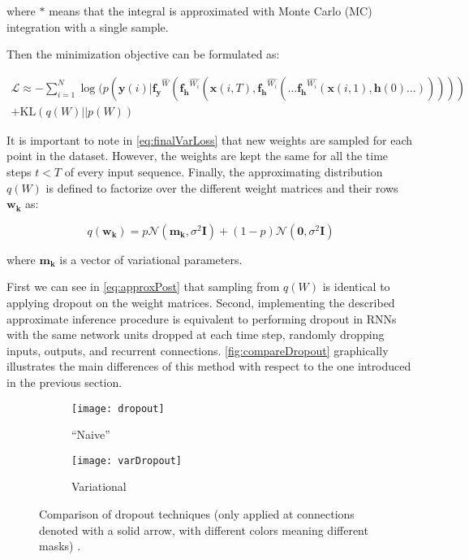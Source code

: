 where $*$ means that the integral is approximated with Monte Carlo (MC) integration with a single sample.

Then the minimization objective can be formulated as:

\begin{equation} \label{eq:finalVarLoss}
\begin{gathered}
	\mathcal{L} \approx - \sum_{i=1}^{N} \log(p(\mathbf{y}(i) | \mathbf{f_y}^{\hat{W}}(\mathbf{f_h}^{\hat{W_i}}(\mathbf{x}(i,T),\mathbf{f_h}^{\hat{W_i}}(\ldots\mathbf{f_h}^{\hat{W_i}}(\mathbf{x}(i,1),\mathbf{h}(0)\ldots))))) \\ 
	+ \text{KL}(q(W)||p(W))
\end{gathered}
\end{equation}

It is important to note in \autoref{eq:finalVarLoss} that new weights are sampled for each point in the dataset. However, the weights are kept the same for all the time steps $t<T$ of every input sequence. Finally, the approximating distribution $q(W)$ is defined to factorize over the different weight matrices and their rows $\mathbf{w_k}$ as:

\begin{equation} \label{eq:approxPost}
	q(\mathbf{w_k})=p\mathcal{N}(\mathbf{m_k},\sigma^2\mathbf{I})+(1-p)\mathcal{N}(\mathbf{0},\sigma^2\mathbf{I})
\end{equation}

where $\mathbf{m_k}$ is a vector of variational parameters.

First we can see in \autoref{eq:approxPost} that sampling from $q(W)$ is identical to applying dropout on the weight matrices. Second, implementing the described approximate inference procedure is equivalent to performing dropout in RNNs with the same network units dropped at each time step, randomly dropping inputs, outputs, and recurrent connections. \autoref{fig:compareDropout} graphically illustrates the main differences of this method with respect to the one introduced in the previous section.

\begin{figure}[H]
	\centering
	\begin{subfigure}{.5\textwidth}
		\centering
		\texttt{[image: dropout]}
		\caption{``Naive''}
		\label{fig:dropout}
	\end{subfigure}%
	\begin{subfigure}{.5\textwidth}
		\centering
		\texttt{[image: varDropout]}
		\caption{Variational}
		\label{fig:varDropout}
	\end{subfigure}
	\caption{Comparison of dropout techniques (only applied at connections denoted with a solid arrow, with different colors meaning different masks) \cite{gal2016theoretically}.}
	\label{fig:compareDropout}
\end{figure}

